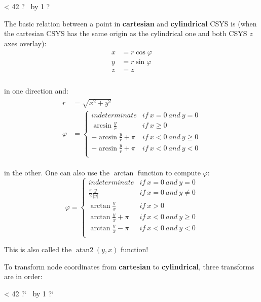\documentclass[10pt,b5paper,titlepage]{book}
\DeclareMathOperator{\atantwo}{atan2}
\newcommand{\repeatit}[3][10]{%
    \myloopcounter1%
    \loop\ifnum\myloopcounter < #1
    #2#3%
    \advance\myloopcounter by 1%
    \repeat%
    #2%
}
\newenvironment{qbox}
{
\begin{center}
    \repeatit[42]{?}{\ }
\end{center}
}
{
\begin{center}
    \repeatit[42]{?`}{\ }
\end{center}
}
\newenvironment{eqarray}
{
    \begin{eqnarray}
        \begin{aligned}
}
{
        \end{aligned}
    \end{eqnarray}
}
\begin{document}
\begin{qbox}
    The basic relation between a point in \textbf{cartesian} and \textbf{cylindrical}
    CSYS is (when the cartesian CSYS has the same origin as the cylindrical one
    and both CSYS $ z $ axes overlay):
    \begin{eqarray}
        x &= r \cos \varphi \\
        y &= r \sin \varphi \\
        z &= z \\
    \end{eqarray}

     in one direction and:
     \begin{eqarray}
         r &= \sqrt{x^2 + y^2} \\
         \varphi &= \left\{ \begin{array}{cc}
                    indeterminate & if\ x = 0\ and\ y = 0 \\
                    \arcsin \frac{y}{r} & if\ x \ge 0 \\
                    -\arcsin \frac{y}{r} + \pi & if\ x < 0\ and\ y \ge 0 \\
                    -\arcsin \frac{y}{r} + \pi & if\ x < 0\ and\ y < 0 \\
                 \end{array} \right.
     \end{eqarray}

     in the other. One can also use the $ \arctan $ function to compute $ \varphi $:
     \begin{equation}
         \varphi = \left\{ \begin{array}{cc}
                 indeterminate & if\ x = 0\ and\ y = 0 \\
                 \frac{\pi}{2}\frac{y}{|y|} & if\ x = 0\ and\ y \ne 0 \\
                 \arctan \frac{y}{x} & if\ x > 0 \\
                 \arctan \frac{y}{x} + \pi & if\ x < 0\ and\ y \ge 0 \\
                 \arctan \frac{y}{x} - \pi & if\ x < 0\ and\ y < 0 \\
             \end{array} \right.
     \end{equation}

     This is also called the $ \atantwo (y, x) $ function!

     To transform node coordinates from \textbf{cartesian} to \textbf{cylindrical},
     three transforms are in order:


\end{qbox}
\end{document}
